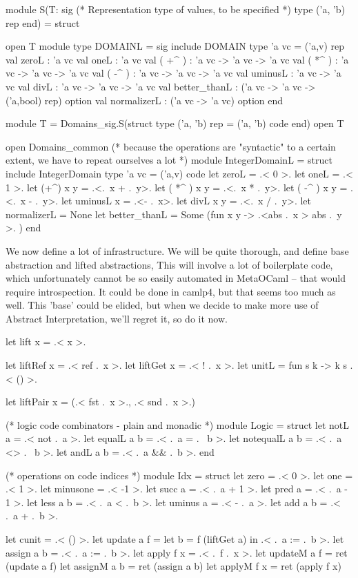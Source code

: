 \documentclass[draft]{elsart}
\begin{document}
\begin{code}
module S(T:
  sig
	(* Representation type of values,  to be specified *)
    type ('a, 'b) rep
  end) = struct

open T
module type DOMAINL = sig
  include DOMAIN
  type 'a vc = ('a,v) rep
  val zeroL : 'a vc
  val oneL : 'a vc
  val ( +^ ) : 'a vc -> 'a vc -> 'a vc
  val ( *^ ) : 'a vc -> 'a vc -> 'a vc
  val ( -^ ) : 'a vc -> 'a vc -> 'a vc
  val uminusL : 'a vc -> 'a vc
  val divL : 'a vc -> 'a vc -> 'a vc
  val better_thanL : ('a vc -> 'a vc -> ('a,bool) rep) option
  val normalizerL : ('a vc -> 'a vc) option
end 

module T = Domains_sig.S(struct type ('a, 'b) rep = ('a, 'b) code end)
open T

open Domains_common
(* because the operations are "syntactic" to a certain extent,
   we have to repeat ourselves a lot *)
module IntegerDomainL = struct
    include IntegerDomain
    type 'a vc = ('a,v) code
    let zeroL = .< 0 >.  
    let oneL = .< 1 >. 
    let (+^) x y = .<.~x + .~y>. 
    let ( *^ ) x y = .<.~x * .~y>.
    let ( -^ ) x y = .<.~x - .~y>.
    let uminusL x = .<- .~x>.
    let divL x y = .<.~x / .~y>. 
    let normalizerL = None
    let better_thanL = Some (fun x y -> .<abs .~x > abs .~y >. )
end
\end{code}

We now define a lot of infrastructure.  We will be quite thorough, and
define base abstraction and lifted abstractions, This will involve a
lot of boilerplate code, which unfortunately cannot be so easily
automated in MetaOCaml -- that would require introspection.  It could
be done in camlp4, but that seems too much as well.  This 'base' could
be elided, but when we decide to make more use of Abstract
Interpretation, we'll regret it, so do it now.
\begin{code}
let lift x = .< x >.

let liftRef x = .< ref .~x >. 
let liftGet x = .< ! .~x >. 
let unitL = fun s k -> k s .< () >.

let liftPair x = (.< fst .~x >., .< snd .~x >.)

(* logic code combinators - plain and monadic *)
module Logic = struct
  let notL a        = .< not .~a >.
  let equalL a b    = .< .~a = .~ b >.
  let notequalL a b = .< .~a <> .~ b >.
  let andL a b     = .< .~a && .~b >. 
end

(* operations on code indices *)
module Idx = struct
  let zero = .< 0 >.
  let one = .< 1 >.
  let minusone = .< -1 >.
  let succ a = .< .~a + 1 >.
  let pred a = .< .~a - 1 >.
  let less a b = .< .~a < .~b >.
  let uminus a = .< - .~a >.
  let add a b = .< .~a + .~b >.

let cunit = .< () >.
let update a f = let b = f (liftGet a) in .< .~a := .~b >.
let assign a b = .< .~a := .~b >.
let apply  f x = .< .~f .~x >.
let updateM a f = ret (update a f)
let assignM a b = ret (assign a b)
let applyM  f x = ret (apply f x)
\end{code}
\end{document}
